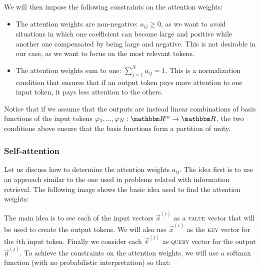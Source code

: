 We will then impose the following constraints on the attention weights:

\begin{itemize}
    \item The attention weights are non-negative: $a_{ij} \geq 0$, as we want to avoid situations in which one coefficient can become large and positive while another one compensated by being large and negative. This is not desirable in our case, as we want to focus on the most relevant tokens.
    \item The attention weights sum to one: $\sum_{j=1}^N a_{ij} = 1$. This is a normalization condition that ensures that if an output token pays more attention to one input token, it pays less attention to the others. 
\end{itemize}

\begin{remark}
    Notice that if we assume that the outputs are instead linear combinations of basis functions of the input tokens $\phi_1,...,\phi_N : \RR^m \to \RR$, the two conditions above ensure that the basis functions form a partition of unity. 
\end{remark}


\subsubsection*{Self-attention}
    Let us discuss how to determine the attention weights $a_{ij}$. The idea first is to use an approach similar to the one used in problems related with information retrieval. The following image shows the basic idea used to find the attention weights: 



    The main idea is to see each of the input vectors $\vec{x}^{(i)}$ as a \textsc{value} vector that will be used to create the output tokens. We will also use $\vec{x}^{(i)}$ as the \textsc{key} vector for the $i$th input token. Finally  we consider each $\vec{x}^{(j)}$ as \textsc{query} vector for the output $\vec{y}^{(j)}$. To achieve the constraints on the attention weights, we will use a softmax function (with no probabilistic interpretation) so that: 


